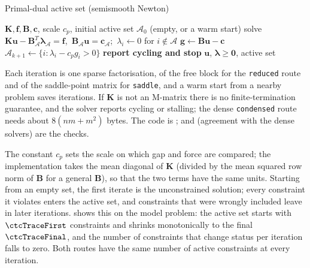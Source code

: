 \begin{algbox}{Primal-dual active set (semismooth Newton)}
\begin{pseudo}
\Require $\bm K,\bm f,\bm B,\bm c$, scale $c_p$, initial active set $\mathcal A_0$ (empty, or a warm start)
\Repeat
  \State solve $\bm K\bm u-\bm B_{\mathcal A}^T\bm\lambda_{\mathcal A}=\bm f$,\ $\bm B_{\mathcal A}\bm u=\bm c_{\mathcal A}$;\ $\lambda_i\gets0$ for $i\notin\mathcal A$ 
  \State $\bm g\gets\bm B\bm u-\bm c$
  \State $\mathcal A_{k+1}\gets\{i:\lambda_i-c_pg_i>0\}$
   \textbf{report cycling and stop} \EndIf
{}
\Ensure $\bm u$, $\bm\lambda\ge\bm0$, active set
\end{pseudo}
\end{algbox}

Each iteration is one sparse factorisation, of the free block for the \texttt{reduced} route and of the saddle-point matrix for \texttt{saddle}, and a warm start from a nearby problem saves iterations. If $\bm K$ is not an M-matrix there is no finite-termination guarantee, and the solver reports cycling or stalling; the dense \texttt{condensed} route needs about $8(nm+m^2)$ bytes. The code is ;  and  (agreement with the dense solvers) are the checks.


The constant $c_p$ sets the scale on which gap and force are compared; the implementation takes the mean diagonal of $\bm K$ (divided by the mean squared row norm of $\bm B$ for a general $\bm B$), so that the two terms have the same units. Starting from an empty set, the first iterate is the unconstrained solution; every constraint it violates enters the active set, and constraints that were wrongly included leave in later iterations.  shows this on the model problem: the active set starts with $\ctcTraceFirst$ constraints and shrinks monotonically to the final $\ctcTraceFinal$, and the number of constraints that change status per iteration falls to zero. Both routes have the same number of active constraints at every iteration.

